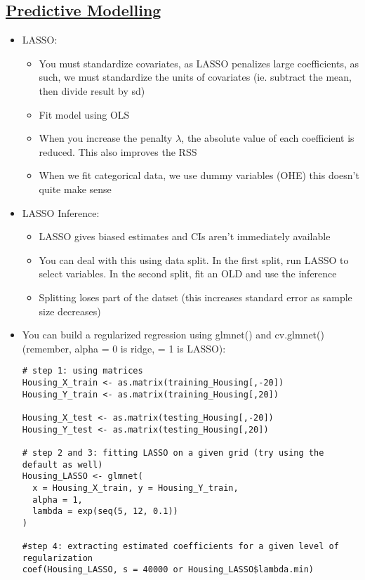 \documentclass[8pt,landscape,a4paper, fleqn, dvipsnames]{extarticle}
\begin{document}
\begin{multicols*}{4}
\section*{\ul{Predictive Modelling}}
\begin{itemize}
    \item LASSO:
    \begin{itemize}
        \item You must standardize covariates, as LASSO penalizes large coefficients, as such, we must standardize the units of covariates (ie. subtract the mean, then divide result by sd)
        \item Fit model using OLS
        \item When you increase the penalty $\lambda$, the absolute value of each coefficient is reduced. This also improves the RSS
        \item When we fit categorical data, we use dummy variables (OHE) this doesn't quite make sense
    \end{itemize}
    \item LASSO Inference:
    \begin{itemize}
        \item LASSO gives biased estimates and CIs aren't immediately available
        \item You can deal with this using data split. In the first split, run LASSO to select variables. In the second split, fit an OLD and use the inference
        \item Splitting loses part of the datset (this increases standard error as sample size decreases)
    \end{itemize}
    \item You can build a regularized regression using glmnet() and cv.glmnet() (remember, alpha = 0 is ridge, = 1 is LASSO):
    \begin{lstlisting}
# step 1: using matrices
Housing_X_train <- as.matrix(training_Housing[,-20])
Housing_Y_train <- as.matrix(training_Housing[,20])

Housing_X_test <- as.matrix(testing_Housing[,-20])
Housing_Y_test <- as.matrix(testing_Housing[,20])

# step 2 and 3: fitting LASSO on a given grid (try using the default as well)
Housing_LASSO <- glmnet(
  x = Housing_X_train, y = Housing_Y_train,
  alpha = 1,
  lambda = exp(seq(5, 12, 0.1))
)

#step 4: extracting estimated coefficients for a given level of regularization
coef(Housing_LASSO, s = 40000 or Housing_LASSO$lambda.min)


\end{lstlisting}
\end{itemize}
\end{multicols*}
\end{document}
